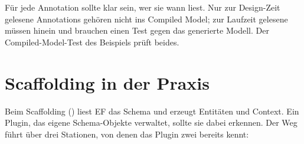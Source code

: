 \begin{tip}
  Für jede Annotation sollte klar sein, wer sie wann liest. Nur zur Design-Zeit gelesene
  Annotations gehören nicht ins Compiled Model; zur Laufzeit gelesene müssen hinein und
  brauchen einen Test gegen das generierte Modell. Der Compiled-Model-Test des Beispiels
  prüft beides.
\end{tip}

\chapter{Scaffolding in der Praxis}\label{ch:scaffolding-in-practice}

Beim Scaffolding () liest EF das Schema und erzeugt
Entitäten und Context. Ein Plugin, das eigene Schema-Objekte verwaltet, sollte sie dabei
erkennen. Der Weg führt über drei Stationen, von denen das Plugin zwei bereits kennt:

\begin{flowdiagram}
\end{flowdiagram}

